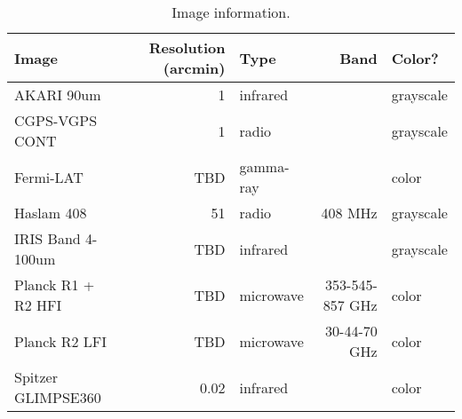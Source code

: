 
\begin{table}[tb]

\caption{Image information.}
\label{tab:images}
\begin{tabular}{ lrlrl }
\hline

Image & Resolution (arcmin) & Type & Band & Color?\\ \hline
AKARI 90um & 1 & infrared &  & grayscale\\
CGPS-VGPS CONT & 1 & radio &  & grayscale\\
Fermi-LAT & TBD & gamma-ray &  & color\\
Haslam 408 & 51 & radio & 408 MHz & grayscale\\
IRIS Band 4-100um & TBD & infrared &  & grayscale\\
Planck R1 + R2 HFI & TBD & microwave & 353-545-857 GHz & color\\
Planck R2 LFI & TBD & microwave & 30-44-70 GHz & color\\
Spitzer GLIMPSE360 & 0.02 & infrared &  & color\\
\hline
\end{tabular}

\end{table}
